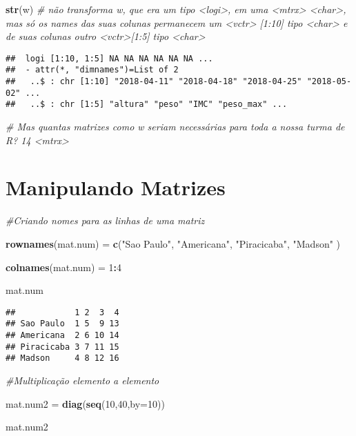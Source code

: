 \documentclass[]{article}
\newenvironment{Shaded}{\begin{snugshade}}{\end{snugshade}}
\newcommand{\KeywordTok}[1]{\textcolor[rgb]{0.13,0.29,0.53}{\textbf{#1}}}
\newcommand{\DataTypeTok}[1]{\textcolor[rgb]{0.13,0.29,0.53}{#1}}
\newcommand{\DecValTok}[1]{\textcolor[rgb]{0.00,0.00,0.81}{#1}}
\newcommand{\StringTok}[1]{\textcolor[rgb]{0.31,0.60,0.02}{#1}}
\newcommand{\CommentTok}[1]{\textcolor[rgb]{0.56,0.35,0.01}{\textit{#1}}}
\newcommand{\OperatorTok}[1]{\textcolor[rgb]{0.81,0.36,0.00}{\textbf{#1}}}
\newcommand{\NormalTok}[1]{#1}
\begin{document}
\begin{Shaded}
\begin{Highlighting}[]
\KeywordTok{str}\NormalTok{(w) }\CommentTok{# não transforma w, que era um tipo <logi>, em uma <mtrx> <char>, mas só os names das suas colunas permanecem um <vctr> [1:10] tipo <char> e de suas colunas outro <vctr>[1:5] tipo <char>}
\end{Highlighting}
\end{Shaded}

\begin{verbatim}
##  logi [1:10, 1:5] NA NA NA NA NA NA ...
##  - attr(*, "dimnames")=List of 2
##   ..$ : chr [1:10] "2018-04-11" "2018-04-18" "2018-04-25" "2018-05-02" ...
##   ..$ : chr [1:5] "altura" "peso" "IMC" "peso_max" ...
\end{verbatim}

\begin{Shaded}
\begin{Highlighting}[]
\CommentTok{# Mas quantas matrizes como w seriam necessárias para toda a nossa turma de R? 14 <mtrx>}
\end{Highlighting}
\end{Shaded}

\section{Manipulando Matrizes}\label{manipulando-matrizes}

\begin{Shaded}
\begin{Highlighting}[]
\CommentTok{#Criando nomes para as linhas de uma matriz}

\KeywordTok{rownames}\NormalTok{(mat.num) =}\StringTok{ }\KeywordTok{c}\NormalTok{(}\StringTok{"Sao Paulo"}\NormalTok{, }\StringTok{"Americana"}\NormalTok{, }\StringTok{"Piracicaba"}\NormalTok{, }\StringTok{"Madson"}\NormalTok{ )}

\KeywordTok{colnames}\NormalTok{(mat.num) =}\StringTok{ }\DecValTok{1}\OperatorTok{:}\DecValTok{4}

\NormalTok{mat.num}
\end{Highlighting}
\end{Shaded}

\begin{verbatim}
##            1 2  3  4
## Sao Paulo  1 5  9 13
## Americana  2 6 10 14
## Piracicaba 3 7 11 15
## Madson     4 8 12 16
\end{verbatim}

\begin{Shaded}
\begin{Highlighting}[]
\CommentTok{#Multiplicação elemento a elemento}

\NormalTok{mat.num2 =}\StringTok{ }\KeywordTok{diag}\NormalTok{(}\KeywordTok{seq}\NormalTok{(}\DecValTok{10}\NormalTok{,}\DecValTok{40}\NormalTok{,}\DataTypeTok{by=}\DecValTok{10}\NormalTok{))}

\NormalTok{mat.num2}
\end{Highlighting}
\end{Shaded}
\end{document}
